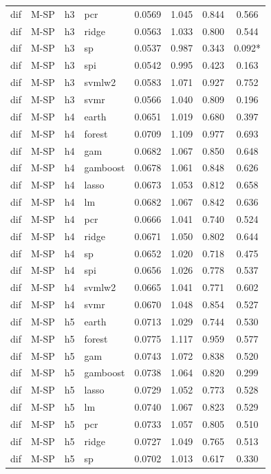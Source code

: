\begin{ThreePartTable}
\begin{longtable}[t]{llclcccc}
dif & M-SP & h3 & pcr & 0.0569 & 1.045 & 0.844 & 0.566\\
dif & M-SP & h3 & ridge & 0.0563 & 1.033 & 0.800 & 0.544\\
dif & M-SP & h3 & sp & 0.0537 & 0.987 & 0.343 & 0.092*\\
dif & M-SP & h3 & spi & 0.0542 & 0.995 & 0.423 & 0.163\\
dif & M-SP & h3 & svmlw2 & 0.0583 & 1.071 & 0.927 & 0.752\\
dif & M-SP & h3 & svmr & 0.0566 & 1.040 & 0.809 & 0.196\\
\addlinespace
dif & M-SP & h4 & earth & 0.0651 & 1.019 & 0.680 & 0.397\\
dif & M-SP & h4 & forest & 0.0709 & 1.109 & 0.977 & 0.693\\
dif & M-SP & h4 & gam & 0.0682 & 1.067 & 0.850 & 0.648\\
dif & M-SP & h4 & gamboost & 0.0678 & 1.061 & 0.848 & 0.626\\
dif & M-SP & h4 & lasso & 0.0673 & 1.053 & 0.812 & 0.658\\
dif & M-SP & h4 & lm & 0.0682 & 1.067 & 0.842 & 0.636\\
dif & M-SP & h4 & pcr & 0.0666 & 1.041 & 0.740 & 0.524\\
dif & M-SP & h4 & ridge & 0.0671 & 1.050 & 0.802 & 0.644\\
dif & M-SP & h4 & sp & 0.0652 & 1.020 & 0.718 & 0.475\\
dif & M-SP & h4 & spi & 0.0656 & 1.026 & 0.778 & 0.537\\
dif & M-SP & h4 & svmlw2 & 0.0665 & 1.041 & 0.771 & 0.602\\
dif & M-SP & h4 & svmr & 0.0670 & 1.048 & 0.854 & 0.527\\
\addlinespace
dif & M-SP & h5 & earth & 0.0713 & 1.029 & 0.744 & 0.530\\
dif & M-SP & h5 & forest & 0.0775 & 1.117 & 0.959 & 0.577\\
dif & M-SP & h5 & gam & 0.0743 & 1.072 & 0.838 & 0.520\\
dif & M-SP & h5 & gamboost & 0.0738 & 1.064 & 0.820 & 0.299\\
dif & M-SP & h5 & lasso & 0.0729 & 1.052 & 0.773 & 0.528\\
dif & M-SP & h5 & lm & 0.0740 & 1.067 & 0.823 & 0.529\\
dif & M-SP & h5 & pcr & 0.0733 & 1.057 & 0.805 & 0.510\\
dif & M-SP & h5 & ridge & 0.0727 & 1.049 & 0.765 & 0.513\\
dif & M-SP & h5 & sp & 0.0702 & 1.013 & 0.617 & 0.330\\

\end{longtable}
\end{ThreePartTable}
